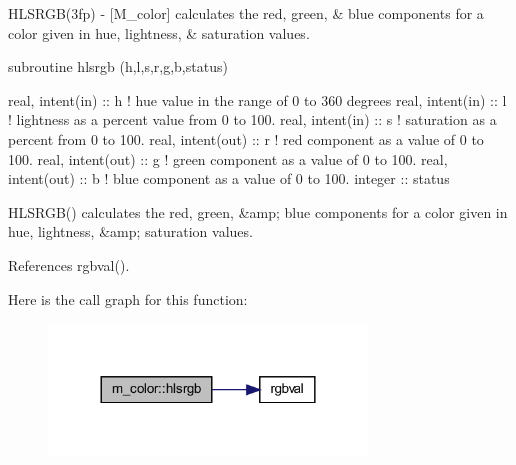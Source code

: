 \begin{DoxyDescription}
\item[\label{_HLSRGB}%
N\+A\+ME ]H\+L\+S\+R\+G\+B(3fp) -\/ \mbox{[}M\+\_\+color\mbox{]} calculates the red, green, \& blue components for a color given in hue, lightness, \& saturation values. 


\item[S\+Y\+N\+O\+P\+S\+IS ]
\begin{DoxyPre}
    subroutine hlsrgb (h,l,s,r,g,b,status)\end{DoxyPre}



\begin{DoxyPre}     real, intent(in)  :: h ! hue value in the range of 0 to 360 degrees
     real, intent(in)  :: l ! lightness as a percent value from 0 to 100.
     real, intent(in)  :: s ! saturation as a percent from 0 to 100.
     real, intent(out) :: r ! red component as a value of 0 to 100.
     real, intent(out) :: g ! green component as a value of 0 to 100.
     real, intent(out) :: b ! blue component as a value of 0 to 100.
     integer           :: status
    \end{DoxyPre}
 


\item[D\+E\+S\+C\+R\+I\+P\+T\+I\+ON ]\begin{DoxyVerb}HLSRGB() calculates the red, green, &amp; blue components for a
 color given in hue, lightness, &amp; saturation values.
\end{DoxyVerb}
 


\end{DoxyDescription}

References rgbval().

Here is the call graph for this function\+:
\nopagebreak
\begin{figure}[H]
\begin{center}
\leavevmode
\includegraphics[width=240pt]{namespacem__color_a40e6c91da216384eded2157cdaf86eba_cgraph}
\end{center}
\end{figure}
\mbox{\label{namespacem__color_a56dd07bbf1378ccc78a230d171f9d429}} 
